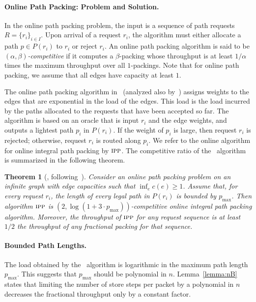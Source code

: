 \documentclass[11pt]{article}
\newtheorem{theorem}{Theorem}
\newcommand{\route}{\text{\sc{ipp}}\xspace}
\newcommand{\IPP}{\route}
\newcommand{\pmax}{p_{\max}}
\newenvironment{proof sketch}[1]{\noindent {\emph{Proof sketch of #1:}}}{\hfill \qed}
\begin{document}
\paragraph{Online Path Packing: Problem and Solution\ifnum{}.\fi}
In the
online path packing problem, the input is a sequence of
path requests $R=\{r_i\}_{i\in I}$.  Upon arrival of a
request $r_i$, the algorithm must either allocate a path
$p\in P(r_i)$ to $r_i$ or reject $r_i$.  An online path
packing algorithm is said to be
\emph{$(\alpha,\beta)$-competitive} if it computes a
$\beta$-packing whose throughput is at least $1/\alpha$
times the maximum throughput over all $1$-packings. Note
that for online path packing, we assume that all edges have
capacity at least $1$.

The online path packing algorithm in~\cite{AAP} (analyzed also by~\cite{BN06})
assigns weights to the edges that are exponential in the load of the edges. This load
is the load incurred by the paths allocated to the requests that have been accepted
so far. The algorithm is based on an oracle that is input $r_i$ and the edge weights,
and outputs a lightest path $p_i$ in $P(r_i)$. If the weight of $p_i$ is large, then
request $r_i$ is rejected; otherwise, request $r_i$ is routed along $p_i$.
We refer to the online algorithm for online integral path packing by
$\route$.
The competitive ratio of the \route\ algorithm is summarized in the following theorem.
\begin{theorem}[\cite{EM14}, following~\cite{AAP, BN06}]
\label{thm:IPP}\sloppy Consider an online path packing
problem on an infinite graph with edge capacities such that $\inf_{e}c(e) \geq 1$.
Assume that, for every request $r_i$, the length of every legal path in $P(r_i)$ is
bounded by $p_{\max}$.  Then algorithm $\route$ is $(2,\log(1+ 3\cdot
\pmax))$-competitive online integral path packing algorithm.  Moreover, the
throughput of $\route$ for any request sequence is at least $1/2$ the throughput of
any fractional packing for that sequence.
\end{theorem}

\paragraph{Bounded Path Lengths\ifnum{}.\fi}
The load obtained by the \IPP\ algorithm is logarithmic in the maximum path length
$\pmax$. This suggests that $\pmax$ should be polynomial in $n$.
Lemma~\ref{lemma:nB} states that limiting the number of store steps per packet by a
polynomial in $n$ decreases the fractional throughput only by a constant factor.
\end{document}
